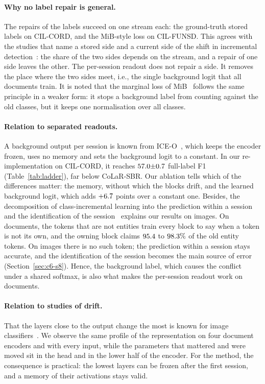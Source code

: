 \paragraph{Why no label repair is general.} The repairs of the labels succeed on one
stream each: the ground-truth stored labels on CIL-CORD, and the MiB-style loss on
CIL-FUNSD. This agrees with the studies that name a stored side and a current side of the
shift in incremental detection~\citep{liu2023abr,mo2024bpf}: the share of the two sides
depends on the stream, and a repair of one side leaves the other. The per-session readout
does not repair a side. It removes the place where the two sides meet, i.e., the single
background logit that all documents train. It is noted that the marginal loss of
MiB~\citep{cermelli2020mib} follows the same principle in a weaker form: it stops a
background label from counting against the old classes, but it keeps one normalisation over
all classes.

\paragraph{Relation to separated readouts.} A background output per session is known from
ICE-O~\citep{liu2023ice}, which keeps the encoder frozen, uses no memory and sets the
background logit to a constant. In our re-implementation on CIL-CORD, it reaches
$57.0{\pm}0.7$ full-label F1 (Table~\ref{tab:ladder}), far below CoLaR-SBR. Our ablation
tells which of the differences matter: the memory, without which the blocks drift, and the
learned background logit, which adds $+6.7$ points over a constant one. Besides, the
decomposition of class-incremental learning into the prediction within a session and the
identification of the session~\citep{kim2022theoretical} explains our results on images.
On documents, the tokens that are not entities train every block to say when a token is
not its own, and the owning block claims $95.4$ to $98.3\%$ of the old
entity tokens. On images there is no such token; the prediction within a session stays
accurate, and the identification of the session becomes the main source of error
(Section~\ref{sec:c6-s8}). Hence, the background label, which causes the conflict under a
shared softmax, is also what makes the per-session readout work on documents.

\paragraph{Relation to studies of drift.} That the layers close to the output change the
most is known for image classifiers~\citep{ramasesh2021anatomy}. We observe the same
profile of the representation on four document encoders and with every input, while the
parameters that mattered and were moved sit in the head and in the lower half of the
encoder. For the method, the consequence is practical: the lowest layers can be frozen
after the first session, and a memory of their activations stays valid.

